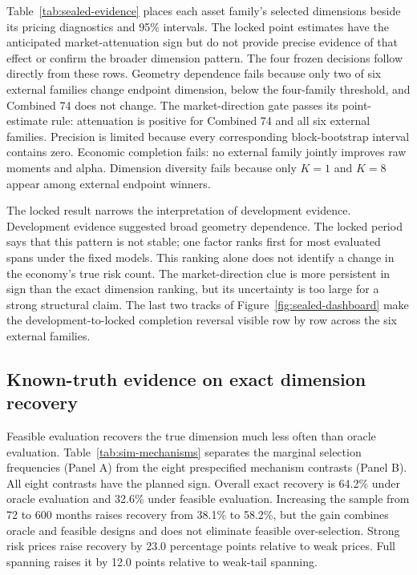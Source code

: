 Table~\ref{tab:sealed-evidence} places each asset family's selected dimensions beside its pricing diagnostics and 95\% intervals. The locked point estimates have the anticipated market-attenuation sign but do not provide precise evidence of that effect or confirm the broader dimension pattern. The four frozen decisions follow directly from these rows. Geometry dependence fails because only two of six external families change endpoint dimension, below the four-family threshold, and Combined 74 does not change. The market-direction gate passes its point-estimate rule: attenuation is positive for Combined 74 and all six external families. Precision is limited because every corresponding block-bootstrap interval contains zero. Economic completion fails: no external family jointly improves raw moments and alpha. Dimension diversity fails because only $K=1$ and $K=8$ appear among external endpoint winners.





The locked result narrows the interpretation of development evidence. Development evidence suggested broad geometry dependence. The locked period says that this pattern is not stable; one factor ranks first for most evaluated spans under the fixed models. This ranking alone does not identify a change in the economy's true risk count. The market-direction clue is more persistent in sign than the exact dimension ranking, but its uncertainty is too large for a strong structural claim. The last two tracks of Figure~\ref{fig:sealed-dashboard} make the development-to-locked completion reversal visible row by row across the six external families.

\subsection{Known-truth evidence on exact dimension recovery}

Feasible evaluation recovers the true dimension much less often than oracle evaluation. Table~\ref{tab:sim-mechanisms} separates the marginal selection frequencies (Panel A) from the eight prespecified mechanism contrasts (Panel B). All eight contrasts have the planned sign. Overall exact recovery is 64.2\% under oracle evaluation and 32.6\% under feasible evaluation. Increasing the sample from 72 to 600 months raises recovery from 38.1\% to 58.2\%, but the gain combines oracle and feasible designs and does not eliminate feasible over-selection. Strong risk prices raise recovery by 23.0 percentage points relative to weak prices. Full spanning raises it by 12.0 points relative to weak-tail spanning.

